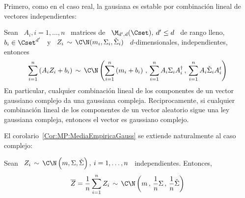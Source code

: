 Primero, como en  el caso real, la gausiana es  estable por combinaci\'on lineal
de vectores independientes:
%
\begin{teorema}[Stabilidad]
\label{Teo:MP:StabilidadGaussianaCompleja}
%
  Sean \ $A_i , i = 1,\ldots,n$  \ matrices de \ $\M_{d',d}(\Cset), \: d' \le d$
  \  de   rango  lleno,   $b_i  \in  \Cset^{d'}$   \  y   \  $Z_i  \,   \sim  \,
  \C\N(m_i,\Sigma_i,\check{\Sigma}_i)$   \   $d$-dimensionales,  independientes,
  entonces
  \[
  \sum_{i=1}^n \left( A_i  Z_i + b_i \right) \,  \sim \, \C\N\left( \sum_{i=1}^n
    \left( m_i + b_i \right) \, ,  \, \sum_{i=1}^n A_i \Sigma_i A_i^\dag \, , \,
    \sum_{i=1}^n A_i \check{\Sigma}_i A_i^t \right)
  \]
  En particular, cualquier combinaci\'on lineal  de los componentes de un vector
  gaussiano complejo  da una  gaussiana compleja.  Reciprocamente,  si cualquier
  combinaci\'on lineal de  los componentes de un vector  aleatorio sigue una ley
  gaussiana compleja, entonces el vector es gaussiano complejo.
\end{teorema}
%
El corolario~\ref{Cor:MP:MediaEmpiricaGauss} se extiende naturalmente al caso complejo:
%
\begin{corolario}\label{Cor:MP:MediaEmpiricaGaussCompleja}
%
  Sean \ $Z_i \, \sim \, \C\N\left(  m , \Sigma , \check{\Sigma} \right), \: i =
  1, \ldots , n$ \ independientes. Entonces,
  \[
  \overline{Z} =  \frac{1}{n} \sum_{i=1}^n Z_i \,  \sim \, \C\N\left( m  \, , \,
    \frac{1}{n} \Sigma \, , \, \frac{1}{n} \check{\Sigma} \right)
  \]
\end{corolario}

